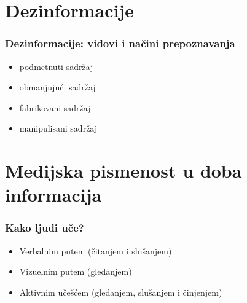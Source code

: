 \documentclass{beamer}
\begin{document}
\section{Dezinformacije}
\begin{frame}[fragile]\frametitle{Dezinformacije: vidovi i načini prepoznavanja}
	\begin{itemize}	
		\item podmetnuti sadržaj
		\item obmanjujući sadržaj
		\item fabrikovani sadržaj
  		\item manipulisani sadržaj
	\end{itemize}
 


\end{frame}

\section{Medijska pismenost u doba informacija}

\begin{frame}[fragile]\frametitle{Kako ljudi uče?}
	\begin{itemize}	
		\item Verbalnim putem (čitanjem i slušanjem)
		\item Vizuelnim putem (gledanjem)
		\item Aktivnim učešćem (gledanjem, slušanjem i činjenjem)
	\end{itemize}
\end{frame}
\end{document}
